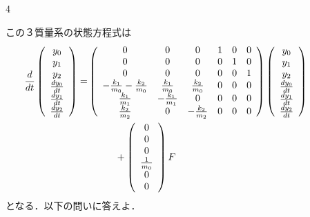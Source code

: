 \documentclass[fleqn]{article}
\begin{document}
\begin{multicols}{4}
\begin{enumerate}
\vfill\null
\columnbreak



この３質量系の状態方程式は
{\footnotesize
\begin{align*} 
\hspace*{-10mm}
 \frac{d}{dt} \left(\begin{array}{c}
	         y_0 \\
		     y_1 \\
		     y_2 \\
		     \frac{dy_0}{dt} \\
		     \frac{dy_1}{dt} \\
		     \frac{dy_2}{dt}
		    \end{array}\right)
 =&
 \left(\begin{array}{cccccc}
        0 & 0 & 0 & 1 & 0 & 0      \\
        0 & 0 & 0 & 0 & 1 & 0      \\
        0 & 0 & 0 & 0 & 0 & 1      \\
	-\frac{k_1}{m_0} -\frac{k_2}{m_0}&  \frac{k_1}{m_0} &  \frac{k_2}{m_0} & 0 & 0 & 0 \\
	 \frac{k_1}{m_1}                & -\frac{k_1}{m_1} &  0               & 0 & 0 & 0 \\
	 \frac{k_2}{m_2}                &  0               & -\frac{k_2}{m_2} & 0 & 0 & 0 
       \end{array}\right)
 \left(\begin{array}{c}
	         y_0 \\
		     y_1 \\
		     y_2 \\
		     \frac{dy_0}{dt} \\
		     \frac{dy_1}{dt} \\
		     \frac{dy_2}{dt}
       \end{array}\right)
\\
 &\hspace*{10mm} +
 \left(\begin{array}{c}
        0 \\
        0 \\
        0 \\
	    \frac{1}{m_0} \\
	    0 \\
	    0 
       \end{array}\right)
        F
\end{align*}
}
となる．以下の問いに答えよ．


\end{enumerate}
\end{multicols}
\end{document}

